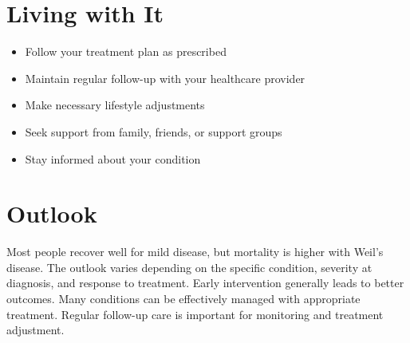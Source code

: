 \section{Living with It}
\begin{itemize}[noitemsep]
  \item Follow your treatment plan as prescribed
  \item Maintain regular follow-up with your healthcare provider
  \item Make necessary lifestyle adjustments
  \item Seek support from family, friends, or support groups
  \item Stay informed about your condition
\end{itemize}
\section{Outlook}
Most people recover well for mild disease, but mortality is higher with Weil's disease. The outlook varies depending on the specific condition, severity at diagnosis, and response to treatment. Early intervention generally leads to better outcomes. Many conditions can be effectively managed with appropriate treatment. Regular follow-up care is important for monitoring and treatment adjustment.

